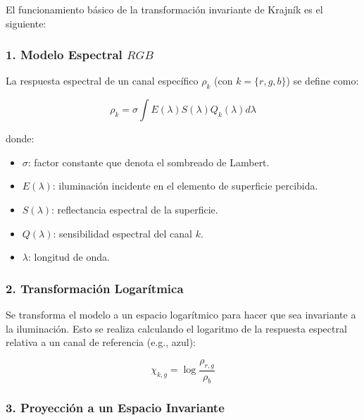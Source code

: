 El funcionamiento básico de la transformación invariante de Krajník es el siguiente:

\subsubsection{1. Modelo Espectral $RGB$}

La respuesta espectral de un canal específico $\rho_k$ (con $k=\lbrace r,g,b\rbrace$) se define como:

$$\rho_k =\sigma \int E(\lambda )S(\lambda )Q_k (\lambda )d\lambda$$

donde:

\begin{itemize}
\setlength{\itemsep}{-1ex}
   \item{\begin{flushleft} $\sigma$: factor constante que denota el sombreado de Lambert. \end{flushleft}}
   \item{\begin{flushleft} $E(\lambda )$: iluminación incidente en el elemento de superficie percibida. \end{flushleft}}
   \item{\begin{flushleft} $S(\lambda )$: reflectancia espectral de la superficie. \end{flushleft}}
   \item{\begin{flushleft} $Q(\lambda )$: sensibilidad espectral del canal $k$. \end{flushleft}}
   \item{\begin{flushleft} $\lambda$: longitud de onda. \end{flushleft}}
\end{itemize}

\subsubsection{2. Transformación Logarítmica}

Se transforma el modelo a un espacio logarítmico para hacer que sea invariante a la iluminación. Esto se realiza calculando el logaritmo de la respuesta espectral relativa a un canal de referencia (e.g., azul):

$$\chi_{k,g} =\log \frac{\rho_{r,g} }{\rho_b }$$

\subsubsection{3. Proyección a un Espacio Invariante}


